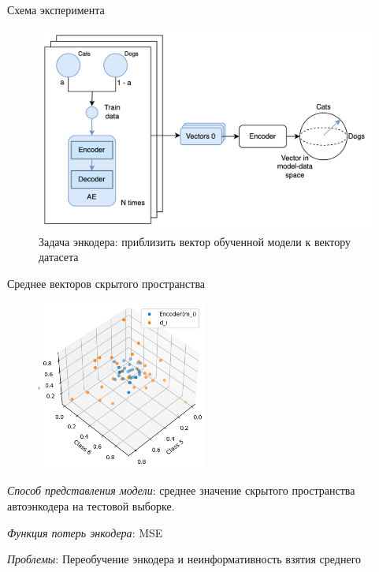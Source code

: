 \documentclass{beamer}
\begin{document}
\begin{frame}{Схема эксперимента}
\begin{figure}
    \includegraphics[width=1.0\linewidth]{Pictures/experiment.png}
    \caption{Задача энкодера: приблизить вектор обученной модели к вектору датасета}
\end{figure}
\end{frame}
\begin{frame}{Среднее векторов скрытого пространства}

\begin{figure}
  \vspace{-30pt}
  \begin{center}
    \includegraphics[width=0.5\textwidth]{Pictures/Encoder.png}
  \end{center}
  \vspace{-20pt}
\end{figure}

\textit{Способ представления модели}: среднее значение скрытого пространства автоэнкодера на тестовой выборке.

\bigskip

\textit{Функция потерь энкодера}: MSE

\bigskip

\textit{Проблемы}: Переобучение энкодера и неинформативность взятия среднего
\end{frame}
\end{document}
